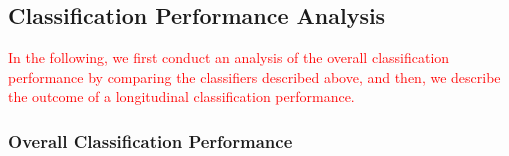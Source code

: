 



\subsection*{Classification Performance Analysis}
\textcolor{red}{In the following, we first conduct an analysis of the overall classification performance by comparing the classifiers described above, and then, we describe the outcome of a longitudinal classification performance.}

\subsubsection*{Overall Classification Performance}


